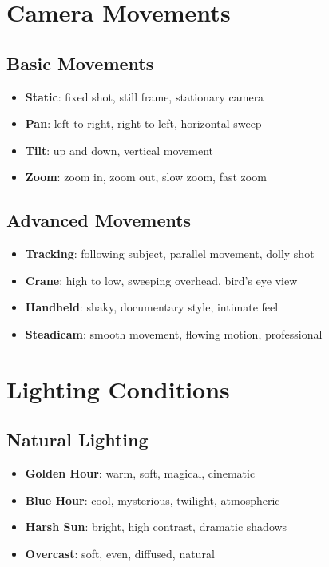 \section{Camera Movements}

\subsection{Basic Movements}
\begin{itemize}
\item \textbf{Static}: fixed shot, still frame, stationary camera
\item \textbf{Pan}: left to right, right to left, horizontal sweep
\item \textbf{Tilt}: up and down, vertical movement
\item \textbf{Zoom}: zoom in, zoom out, slow zoom, fast zoom
\end{itemize}

\subsection{Advanced Movements}
\begin{itemize}
\item \textbf{Tracking}: following subject, parallel movement, dolly shot
\item \textbf{Crane}: high to low, sweeping overhead, bird's eye view
\item \textbf{Handheld}: shaky, documentary style, intimate feel
\item \textbf{Steadicam}: smooth movement, flowing motion, professional
\end{itemize}

\section{Lighting Conditions}

\subsection{Natural Lighting}
\begin{itemize}
\item \textbf{Golden Hour}: warm, soft, magical, cinematic
\item \textbf{Blue Hour}: cool, mysterious, twilight, atmospheric
\item \textbf{Harsh Sun}: bright, high contrast, dramatic shadows
\item \textbf{Overcast}: soft, even, diffused, natural
\end{itemize}

